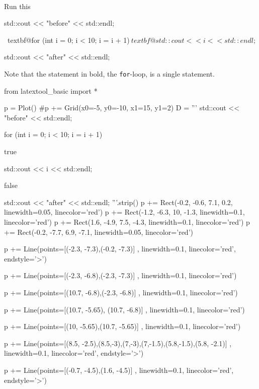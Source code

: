 \newpage{}\\

\begin{ex}
Run this
\begin{console}[commandchars=\~\@\$]
std::cout << "before" << std::endl;

~textbf@for (int i = 0; i < 10; i = i + 1)$
    ~textbf@std::cout << i << std::endl;$
    
std::cout << "after" << std::endl;
\end{console}
\end{ex}

Note that the statement in bold, the \texttt{for}-loop, is a single
statement.
\begin{python}
from latextool_basic import *

p = Plot()
#p += Grid(x0=-5, y0=-10, x1=15, y1=2)
D = '''
std::cout << "before" << std::endl;




for (int i = 0;        i < 10;        i = i + 1)



true

         std::cout << i << std::endl;

false




std::cout << "after" << std::endl;
'''.strip()
p += Rect(-0.2, -0.6, 7.1, 0.2, linewidth=0.05, linecolor='red')
p += Rect(-1.2, -6.3, 10, -1.3, linewidth=0.1, linecolor='red')
p += Rect(1.6, -4.9, 7.5, -4.3, linewidth=0.1, linecolor='red')
p += Rect(-0.2, -7.7, 6.9, -7.1, linewidth=0.05, linecolor='red')


p += Line(points=[(-2.3, -7.3),(-0.2, -7.3)] , linewidth=0.1, linecolor='red', endstyle='>')

p += Line(points=[(-2.3, -6.8),(-2.3, -7.3)] , linewidth=0.1, linecolor='red')

p += Line(points=[(10.7, -6.8),(-2.3, -6.8)] , linewidth=0.1, linecolor='red')

p += Line(points=[(10.7, -5.65), (10.7, -6.8)] , linewidth=0.1, linecolor='red')

p += Line(points=[(10, -5.65),(10.7, -5.65)] , linewidth=0.1, linecolor='red')

p += Line(points=[(8.5, -2.5),(8.5,-3),(7,-3),(7,-1.5),(5.8,-1.5),(5.8, -2.1)] , linewidth=0.1, linecolor='red', endstyle='>')

p += Line(points=[(-0.7, -4.5),(1.6, -4.5)] , linewidth=0.1, linecolor='red', endstyle='>')


\end{python}
